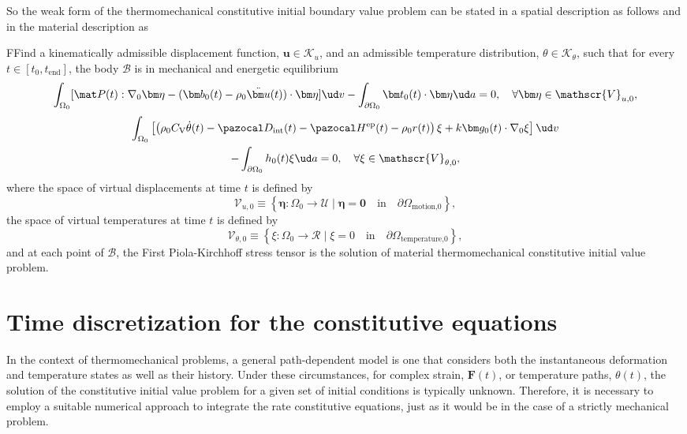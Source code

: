 So the weak form of the thermomechanical constitutive initial boundary value problem can be stated in a spatial description as follows
and in the material description as
\begin{problem}
    FFind a kinematically admissible displacement function, $\bm u\in \mathscr{K}_u$, and an admissible temperature distribution, \(\theta \in \mathscr K_\theta\), such that for every $t\in [t_0,t_\text{end}]$, the body $\mathscr{B}$ is in mechanical and energetic equilibrium
        \begin{equation}
        \int_{\Omega_0} [\mat P(t):\nabla_0 \bm \eta - (\bm b_0(t)-\rho_0\ddot{\bm u}(t))\cdot \bm \eta]\ud v - \int_{\partial\Omega_0} \bm t_0(t)\cdot \bm \eta\ud a = 0,\quad \forall \bm \eta \in \mathscr{V}_{u,0},
        \end{equation}
        \begin{multline}
        \int_{\Omega_0}   \left[\left(\rho_0C_\mathrm{V}\dot\theta(t) - \pazocal D_\text{int}(t) - \pazocal H^\text{ep}(t) - \rho_0 r(t)\right) \xi + k \bm g_0(t)\cdot \nabla_0 \xi\right]\ud v\\ - \int_{\partial\Omega_0} h_0(t) \xi\ud a = 0,\quad \forall \xi \in \mathscr{V}_{\theta,0},
    \end{multline}
    where the space of virtual displacements at time $t$ is defined by
    \begin{equation}
        \mathscr{V}_{u,0} \equiv \left\{\bm \eta:\Omega_0\to \mathscr{U}\;|\;\bm \eta = \bm 0\quad \text{in}\quad \partial\Omega_\text{motion,0}\right\},
    \end{equation}
    the space of virtual temperatures at time $t$ is defined by
    \begin{equation}
    \mathscr{V}_{\theta,0} \equiv \left\{\xi:\Omega_0\to \mathscr{R}\;|\; \xi =  0\quad \text{in}\quad \partial\Omega_\text{temperature,0}\right\},
    \end{equation}
    and at each point of $\mathscr{B}$, the First Piola-Kirchhoff stress tensor is the solution of material thermomechanical constitutive initial value problem.
\end{problem}

\section{Time discretization for the constitutive equations} \label{sec:time_discretization}

In the context of thermomechanical problems, a general path-dependent model is one that considers both the instantaneous deformation and temperature states as well as their history.
Under these circumstances, for complex strain, $\bm F(t)$, or temperature paths, $\theta(t)$, the solution of the constitutive initial value problem for a given set of initial conditions is typically unknown.
Therefore, it is necessary to employ a suitable numerical approach to integrate the rate constitutive equations, just as it would be in the case of a strictly mechanical problem.

